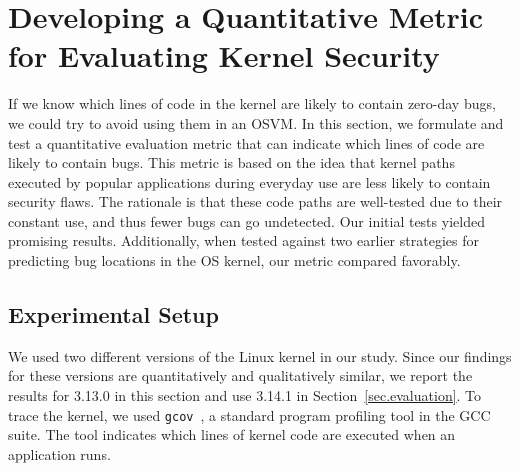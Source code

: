 \section{Developing a Quantitative Metric for Evaluating Kernel Security}
\label{sec.metric}

If we know which lines of code in the kernel are likely to contain zero-day
bugs, we could try to avoid using them in an OSVM.
In this section, we formulate and test a quantitative evaluation metric that
can indicate which lines of code are likely to contain bugs.
This metric is based on the idea that kernel paths executed by popular
applications
during everyday use are less likely to contain security flaws.
The rationale is that these code paths are well-tested due to their constant
use, and thus fewer bugs can go undetected.
Our initial tests yielded promising results.
Additionally, when tested against two earlier strategies for predicting bug
locations in the OS kernel, our metric compared favorably.

\subsection{Experimental Setup}\label{sec-setup}
We used two different versions of
the Linux kernel in our study.
Since our findings for these versions are quantitatively and qualitatively similar, we report
the results for 3.13.0 in this section and use 3.14.1 in Section~\ref{sec.evaluation}.
%
To trace the kernel, we used \texttt{gcov}~\cite{gcov}, a standard program profiling
tool in the GCC suite. The tool indicates which lines of kernel
code are executed when an application runs.

